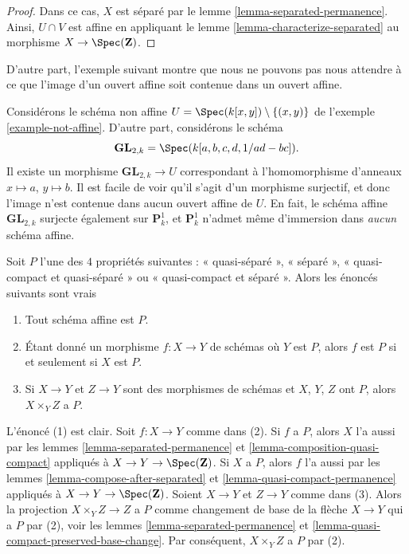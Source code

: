 \begin{proof}
Dans ce cas, $X$ est séparé par le lemme \ref{lemma-separated-permanence}.
Ainsi, $U \cap V$ est affine en
appliquant le lemme \ref{lemma-characterize-separated} au
morphisme $X \to \Spec(\mathbf{Z})$.
\end{proof}

\noindent
D'autre part, l'exemple suivant montre que nous ne pouvons pas nous attendre
à ce que l'image d'un ouvert affine soit contenue dans un ouvert affine.

\begin{example}
\label{example-image-affine-projective}
Considérons le schéma non affine
$U = \Spec(k[x, y]) \setminus \{(x, y)\}$ de
l'exemple \ref{example-not-affine}. D'autre part, considérons le
schéma
$$
\mathbf{GL}_{2, k} = \Spec(k[a, b, c, d, 1/ad - bc]).
$$
Il existe un morphisme $\mathbf{GL}_{2, k} \to U$ correspondant
à l'homomorphisme d'anneaux $x \mapsto a$, $y \mapsto b$. Il est facile
de voir qu'il s'agit d'un morphisme surjectif, et donc l'image n'est
contenue dans aucun ouvert affine de $U$. En fait, le schéma
affine $\mathbf{GL}_{2, k}$ surjecte également sur $\mathbf{P}^1_k$,
et $\mathbf{P}^1_k$ n'admet même d'immersion dans {\it aucun} schéma affine.
\end{example}

\begin{remark}
\label{remark-quasi-compact-and-quasi-separated}
Soit $P$ l'une des $4$ propriétés suivantes : «
quasi-séparé », « séparé », «
quasi-compact et quasi-séparé » ou « quasi-compact et séparé ». Alors les
énoncés suivants sont vrais
\begin{enumerate}
\item Tout schéma affine est $P$.
\item Étant donné un morphisme $f : X \to Y$ de schémas où $Y$ est $P$, alors
$f$ est $P$ si et seulement si $X$ est
$P$. \item Si $X \to Y$ et $Z \to Y$ sont des morphismes de
schémas et $X$, $Y$, $Z$ ont $P$, alors $X \times_Y Z$ a $P$.
\end{enumerate}
L'énoncé (1) est clair.
Soit $f : X \to Y$ comme dans (2). Si $f$ a $P$, alors $X$ l'a aussi
par les lemmes \ref{lemma-separated-permanence} et
\ref{lemma-composition-quasi-compact} appliqués à
$X \to Y \to \Spec(\mathbf{Z})$. Si $X$ a $P$, alors $f$ l'a aussi par les
lemmes \ref{lemma-compose-after-separated} et
\ref{lemma-quasi-compact-permanence} appliqués à $X
\to Y \to \Spec(\mathbf{Z})$. Soient
$X \to Y$ et $Z \to Y$ comme dans (3). Alors
la projection $X \times_Y Z \to Z$ a $P$ comme changement de base de
la flèche $X \to Y$ qui a $P$ par (2), voir les lemmes
\ref{lemma-separated-permanence} et
\ref{lemma-quasi-compact-preserved-base-change}. Par
conséquent, $X \times_Y Z$ a $P$ par (2).
\end{remark}





